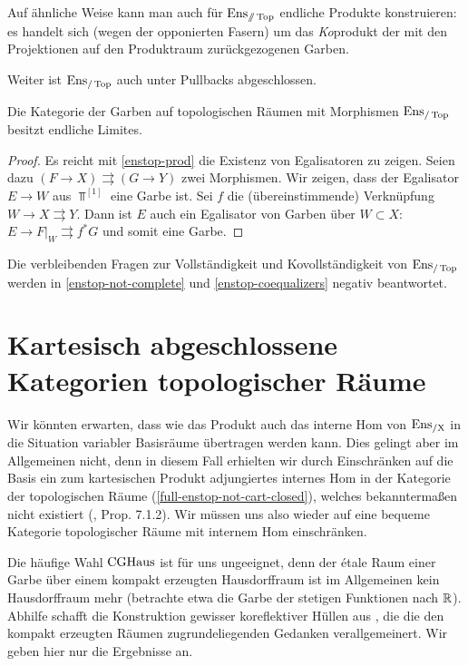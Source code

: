 \begin{bem}
  Auf ähnliche Weise kann man auch für $\operatorname{Ens}_{\mathbin{/\mkern-6mu/} \operatorname{Top}}$ endliche
  Produkte konstruieren: es handelt sich (wegen der opponierten
  Fasern) um das \emph{Ko}produkt der mit den Projektionen auf den
  Produktraum zurückgezogenen Garben.
\end{bem}
Weiter ist $\operatorname{Ens}_{/\operatorname{Top}}$ auch unter Pullbacks abgeschlossen.
\begin{satz} \label{enstop-fin-complete}
  Die Kategorie der Garben auf topologischen Räumen mit Morphismen
  $\operatorname{Ens}_{/\operatorname{Top}}$ besitzt endliche Limites.
\end{satz}
\begin{proof}
  Es reicht mit \ref{enstop-prod} die Existenz von Egalisatoren zu
  zeigen. Seien dazu $(F \to X) \rightrightarrows (G \to Y)$ zwei
  Morphismen. Wir zeigen, dass der Egalisator $E \to W$ aus
  $\Top^{[1]}$ eine Garbe ist. Sei $f$ die (übereinstimmende)
  Verknüpfung $W \to X \rightrightarrows Y$. Dann ist $E$ auch ein
  Egalisator von Garben über $W \subset X$: $E \to F|_W
  \rightrightarrows f^* G$ und somit eine Garbe.
\end{proof}
\begin{bem}
  Die verbleibenden Fragen zur Vollständigkeit und Kovollständigkeit
  von $\operatorname{Ens}_{/\operatorname{Top}}$ werden in \ref{enstop-not-complete} und
  \ref{enstop-coequalizers} negativ beantwortet.
\end{bem}

\section[Kartesisch abgeschlossene Kategorien topologischer Räume]
        {Kartesisch abgeschlossene Kategorien topologischer Räume
        }

Wir könnten erwarten, dass wie das Produkt auch das interne Hom von
$\operatorname{Ens_{/X}}$ in die Situation variabler Basisräume übertragen werden
kann. Dies gelingt aber im Allgemeinen nicht, denn in diesem Fall
erhielten wir durch Einschränken auf die Basis ein zum kartesischen
Produkt adjungiertes internes Hom in der Kategorie der topologischen
Räume (\ref{full-enstop-not-cart-closed}), welches bekanntermaßen
nicht existiert (\cite{Borceux}, Prop. 7.1.2). Wir müssen uns also
wieder auf eine bequeme Kategorie topologischer Räume mit internem Hom
einschränken.

Die häufige Wahl $\operatorname{CGHaus}$ ist für uns ungeeignet, denn der étale Raum
einer Garbe über einem kompakt erzeugten Hausdorffraum ist im
Allgemeinen kein Hausdorffraum mehr (betrachte etwa die Garbe der
stetigen Funktionen nach $\mathbb{R}$). Abhilfe schafft die Konstruktion
gewisser koreflektiver Hüllen aus \cite{Vogt}, die die den kompakt
erzeugten Räumen zugrundeliegenden Gedanken verallgemeinert. Wir geben
hier nur die Ergebnisse an.


